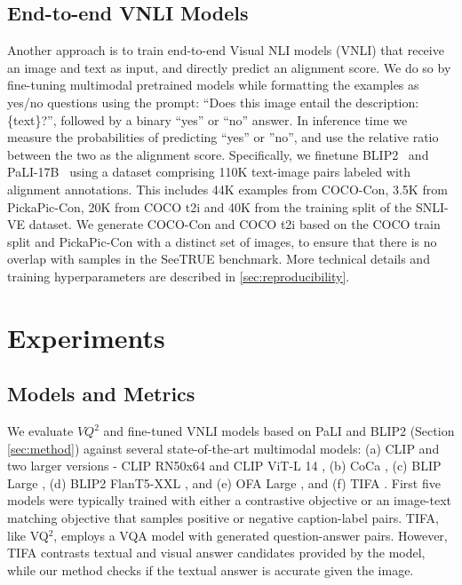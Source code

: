 \documentclass{article}
\newcommand{\datasetname}[0]{SeeTRUE\xspace}
\newcommand{\VQSQR}[0]{VQ$^2$\xspace}
\begin{document}
\subsection{End-to-end VNLI Models}

Another approach is to train end-to-end Visual NLI models (VNLI) that receive an image and text as input, and directly predict an alignment score. We do so by fine-tuning multimodal pretrained models while formatting the examples as yes/no questions using the prompt: ``Does this image entail the description: \{text\}?'', followed by a binary ``yes'' or ``no'' answer. In inference time we measure the probabilities of predicting ``yes'' or ''no'', and use the relative ratio between the two as the alignment score. Specifically, we finetune BLIP2~\cite{li2023blip} and PaLI-17B~\cite{pali2} using a dataset comprising 110K text-image pairs labeled with alignment annotations. This includes 44K examples from COCO-Con, 3.5K from PickaPic-Con, 20K from COCO t2i and 40K from the training split of the SNLI-VE dataset. We generate COCO-Con and COCO t2i based on the COCO train split and PickaPic-Con with a distinct set of images, to ensure that there is no overlap with samples in the \datasetname benchmark. More technical details and training hyperparameters are described in \cref{sec:reproducibility}. 
 
\section{Experiments}
\label{sec:visual_entailment}


\subsection{Models and Metrics}

We evaluate $VQ^2$ and fine-tuned VNLI models based on PaLI and BLIP2 (Section \ref{sec:method}) against several state-of-the-art multimodal models: (a) CLIP \citep{radford2021learning} and two larger versions - CLIP RN50x64 and CLIP ViT-L 14 \citep{dosovitskiy2020image}, (b) CoCa \citep{yu2022coca}, (c) BLIP Large \citep{li2022blip}, (d) BLIP2 FlanT5-XXL \citep{li2023blip}, and (e) OFA Large \citep{wang2022ofa}, and (f) TIFA \citep{hu2023tifa}. First five models were typically trained with either a contrastive objective or an image-text matching objective that samples positive or negative caption-label pairs. TIFA, like \VQSQR, employs a VQA model with generated question-answer pairs. However, TIFA contrasts textual and visual answer candidates provided by the model, while our method checks if the textual answer is accurate given the image.
\end{document}
